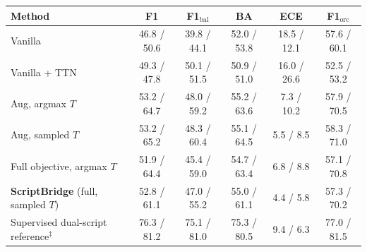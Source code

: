 \begin{lrbox}{\tblbox}\footnotesize\setlength{\tabcolsep}{2.6pt}%
\begin{tabular}{@{}lccccc@{}}
\toprule
Method & F1 & F1$_{\text{bal}}$ & BA & ECE & F1$_{\text{orc}}$\\
\midrule
Vanilla & 46.8 / 50.6 & 39.8 / 44.1 & 52.0 / 53.8 & 18.5 / 12.1 & 57.6 / 60.1\\
Vanilla + TTN & 49.3 / 47.8 & 50.1 / 51.5 & 50.9 / 51.0 & 16.0 / 26.6 & 52.5 / 53.2\\
Aug, argmax $T$ & 53.2 / 64.7 & 48.0 / 59.2 & 55.2 / 63.6 & 7.3 / 10.2 & 57.9 / 70.5\\
Aug, sampled $T$ & 53.2 / 65.2 & 48.3 / 60.4 & 55.1 / 64.5 & 5.5 / 8.5 & 58.3 / 71.0\\
Full objective, argmax $T$ & 51.9 / 64.4 & 45.4 / 59.0 & 54.7 / 63.4 & 6.8 / 8.8 & 57.1 / 70.8\\
\textbf{ScriptBridge} (full, sampled $T$) & 52.8 / 61.1 & 47.0 / 55.2 & 55.0 / 61.1 & 4.4 / 5.8 & 57.3 / 70.2\\
Supervised dual-script reference$^{\ddagger}$ & 76.3 / 81.2 & 75.1 / 81.0 & 75.3 / 80.5 & 9.4 / 6.3 & 77.0 / 81.5\\
\bottomrule
\end{tabular}%
\end{lrbox}
\begin{table}[t]
\caption{Offensive Latin$\to$Arabic under label-prior shift, with 75.6\% offensive items in the Latin-script training data and 29.8\% in the Arabic-script test data. Each cell gives XLM-R / DarijaBERT, averaged over five seeds. F1 is macro-F1 under the argmax decision rule, which for two classes equals a threshold of 0.5 on the predicted probability of the offensive class. F1$_{\text{bal}}$ is macro-F1 on a class-balanced test subsample, BA is balanced accuracy and ECE is expected calibration error, for which lower is better. F1$_{\text{orc}}$ uses a threshold tuned post hoc on the target test set and is a diagnostic comparison only, not a zero-shot result.}
\label{tab:calib}
\centering\footnotesize
\setlength{\tabcolsep}{2.6pt}
\fitbox{\linewidth}
\end{table}